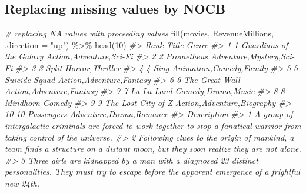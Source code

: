 \documentclass[
]{book}
\newenvironment{Shaded}{\begin{snugshade}}{\end{snugshade}}
\newcommand{\AttributeTok}[1]{\textcolor[rgb]{0.77,0.63,0.00}{#1}}
\newcommand{\CommentTok}[1]{\textcolor[rgb]{0.56,0.35,0.01}{\textit{#1}}}
\newcommand{\DecValTok}[1]{\textcolor[rgb]{0.00,0.00,0.81}{#1}}
\newcommand{\FunctionTok}[1]{\textcolor[rgb]{0.00,0.00,0.00}{#1}}
\newcommand{\NormalTok}[1]{#1}
\newcommand{\SpecialCharTok}[1]{\textcolor[rgb]{0.00,0.00,0.00}{#1}}
\newcommand{\StringTok}[1]{\textcolor[rgb]{0.31,0.60,0.02}{#1}}
\begin{document}
\hypertarget{replacing-missing-values-by-nocb}{%
\subsection{Replacing missing values by NOCB}\label{replacing-missing-values-by-nocb}}

\begin{Shaded}
\begin{Highlighting}[]
\CommentTok{\# replacing NA values with proceeding values}
\FunctionTok{fill}\NormalTok{(movies, RevenueMillions, }\AttributeTok{.direction =} \StringTok{"up"}\NormalTok{) }\SpecialCharTok{\%\textgreater{}\%}
\FunctionTok{head}\NormalTok{(}\DecValTok{10}\NormalTok{)}
\CommentTok{\#\textgreater{}    Rank                   Title                      Genre}
\CommentTok{\#\textgreater{} 1     1 Guardians of the Galaxy    Action,Adventure,Sci{-}Fi}
\CommentTok{\#\textgreater{} 2     2              Prometheus   Adventure,Mystery,Sci{-}Fi}
\CommentTok{\#\textgreater{} 3     3                   Split            Horror,Thriller}
\CommentTok{\#\textgreater{} 4     4                    Sing    Animation,Comedy,Family}
\CommentTok{\#\textgreater{} 5     5           Suicide Squad   Action,Adventure,Fantasy}
\CommentTok{\#\textgreater{} 6     6          The Great Wall   Action,Adventure,Fantasy}
\CommentTok{\#\textgreater{} 7     7              La La Land         Comedy,Drama,Music}
\CommentTok{\#\textgreater{} 8     8                Mindhorn                     Comedy}
\CommentTok{\#\textgreater{} 9     9      The Lost City of Z Action,Adventure,Biography}
\CommentTok{\#\textgreater{} 10   10              Passengers    Adventure,Drama,Romance}
\CommentTok{\#\textgreater{}                                                                                                                                                                                                                                        Description}
\CommentTok{\#\textgreater{} 1                                                                                                                  A group of intergalactic criminals are forced to work together to stop a fanatical warrior from taking control of the universe.}
\CommentTok{\#\textgreater{} 2                                                                                                                  Following clues to the origin of mankind, a team finds a structure on a distant moon, but they soon realize they are not alone.}
\CommentTok{\#\textgreater{} 3                                                                                    Three girls are kidnapped by a man with a diagnosed 23 distinct personalities. They must try to escape before the apparent emergence of a frightful new 24th.}

\end{Highlighting}
\end{Shaded}
\end{document}
